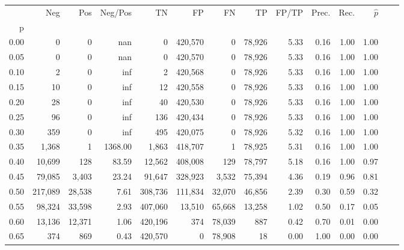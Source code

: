 \begin{tabular}{rrrrrrrrrrrrrr}
\toprule
{} &      Neg &     Pos &  Neg/Pos &       TN &       FP &      FN &      TP & FP/TP & Prec. &  Rec. & $\hat{p}$ \\
p    &          &         &          &          &          &         &         &       &       &       &           \\
\midrule
0.00 &        0 &       0 &      nan &        0 &  420,570 &       0 &  78,926 &  5.33 &  0.16 &  1.00 &      1.00 \\
0.05 &        0 &       0 &      nan &        0 &  420,570 &       0 &  78,926 &  5.33 &  0.16 &  1.00 &      1.00 \\
0.10 &        2 &       0 &      inf &        2 &  420,568 &       0 &  78,926 &  5.33 &  0.16 &  1.00 &      1.00 \\
0.15 &       10 &       0 &      inf &       12 &  420,558 &       0 &  78,926 &  5.33 &  0.16 &  1.00 &      1.00 \\
0.20 &       28 &       0 &      inf &       40 &  420,530 &       0 &  78,926 &  5.33 &  0.16 &  1.00 &      1.00 \\
0.25 &       96 &       0 &      inf &      136 &  420,434 &       0 &  78,926 &  5.33 &  0.16 &  1.00 &      1.00 \\
0.30 &      359 &       0 &      inf &      495 &  420,075 &       0 &  78,926 &  5.32 &  0.16 &  1.00 &      1.00 \\
0.35 &    1,368 &       1 &  1368.00 &    1,863 &  418,707 &       1 &  78,925 &  5.31 &  0.16 &  1.00 &      1.00 \\
0.40 &   10,699 &     128 &    83.59 &   12,562 &  408,008 &     129 &  78,797 &  5.18 &  0.16 &  1.00 &      0.97 \\
0.45 &   79,085 &   3,403 &    23.24 &   91,647 &  328,923 &   3,532 &  75,394 &  4.36 &  0.19 &  0.96 &      0.81 \\
0.50 &  217,089 &  28,538 &     7.61 &  308,736 &  111,834 &  32,070 &  46,856 &  2.39 &  0.30 &  0.59 &      0.32 \\
0.55 &   98,324 &  33,598 &     2.93 &  407,060 &   13,510 &  65,668 &  13,258 &  1.02 &  0.50 &  0.17 &      0.05 \\
0.60 &   13,136 &  12,371 &     1.06 &  420,196 &      374 &  78,039 &     887 &  0.42 &  0.70 &  0.01 &      0.00 \\
0.65 &      374 &     869 &     0.43 &  420,570 &        0 &  78,908 &      18 &  0.00 &  1.00 &  0.00 &      0.00 \\

\end{tabular}
